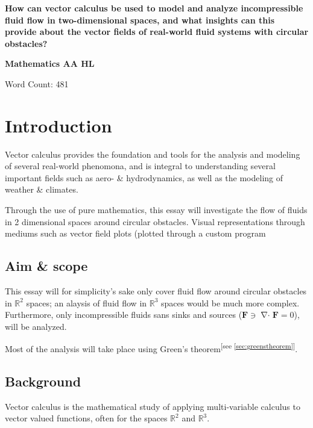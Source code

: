 \documentclass[a4paper, 12pt]{article} %
\newcommand{\researchquestion}{How can vector calculus be used to model and analyze incompressible fluid flow in two-dimensional spaces, and what insights can this provide about the vector fields of real-world fluid systems with circular obstacles?}
\newcommand{\fatf}{\mathbf{F}} %
\newcommand{\referto}[1]{\textsuperscript{\color{darkgray}\tiny[see \ref{#1}]}} %
\DeclareMathOperator{\divergence}{\nabla\cdot} %
\begin{document}
\begin{titlepage} %
	\begin{center}
		\vspace*{0.5cm}
		\Large
		\textbf{\researchquestion}

		\vspace{1.5cm}
		\large
		\textbf{Mathematics AA HL}

		\vfill{}\color{darkgray}
		Word Count: 481 %
	\end{center}
\end{titlepage}

\tableofcontents\newpage %

\section{Introduction}
Vector calculus provides the foundation and tools for the analysis and modeling of several real-world phenomona, and is integral to understanding several important fields such as aero- \& hydrodynamics, as well as the modeling of weather \& climates. 

Through the use of pure mathematics, this essay will investigate the flow of fluids in 2 dimensional spaces around circular obstacles. Visual representations through mediums such as vector field plots (plotted through a custom program
\subsection{Aim \& scope}
This essay will for simplicity's sake only cover fluid flow around circular obstacles in $\mathbb{R}^2$ spaces; an alaysis of fluid flow in $\mathbb{R}^3$ spaces would be much more complex.
Furthermore, only incompressible fluids sans sinks and sources ($\fatf\ni\divergence\fatf=0$), will be analyzed.

Most of the analysis will take place using Green's theorem\referto{sec:greenstheorem}.

\subsection{Background}
Vector calculus is the mathematical study of applying multi-variable calculus to vector valued functions, often for the spaces $\mathbb{R}^2$ and $\mathbb{R}^3$.
\end{document}
